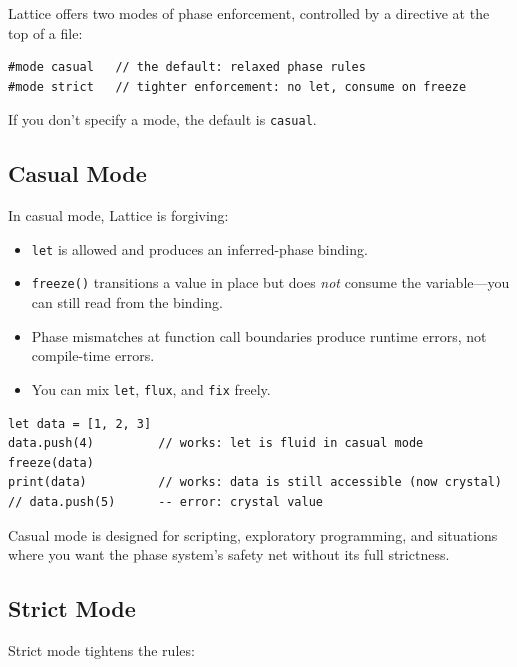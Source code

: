 Lattice offers two modes of phase enforcement, controlled by a directive at the top of a file:

\begin{lstlisting}[language=Lattice, caption={Mode directives}]
#mode casual   // the default: relaxed phase rules
#mode strict   // tighter enforcement: no let, consume on freeze
\end{lstlisting}

If you don't specify a mode, the default is \lstinline|casual|.

\subsection{Casual Mode}\label{subsec:casual-mode}

In casual mode, Lattice is forgiving:

\begin{itemize}
  \item \lstinline|let| is allowed and produces an inferred-phase binding.
  \item \lstinline|freeze()| transitions a value in place but does \emph{not} consume the variable---you can still read from the binding.
  \item Phase mismatches at function call boundaries produce runtime errors, not compile-time errors.
  \item You can mix \lstinline|let|, \lstinline|flux|, and \lstinline|fix| freely.
\end{itemize}

\begin{lstlisting}[language=Lattice, caption={Casual mode: forgiving}]
let data = [1, 2, 3]
data.push(4)         // works: let is fluid in casual mode
freeze(data)
print(data)          // works: data is still accessible (now crystal)
// data.push(5)      -- error: crystal value
\end{lstlisting}

Casual mode is designed for scripting, exploratory programming, and situations where you want the phase system's safety net without its full strictness.

\subsection{Strict Mode}\label{subsec:strict-mode}

Strict mode tightens the rules:

